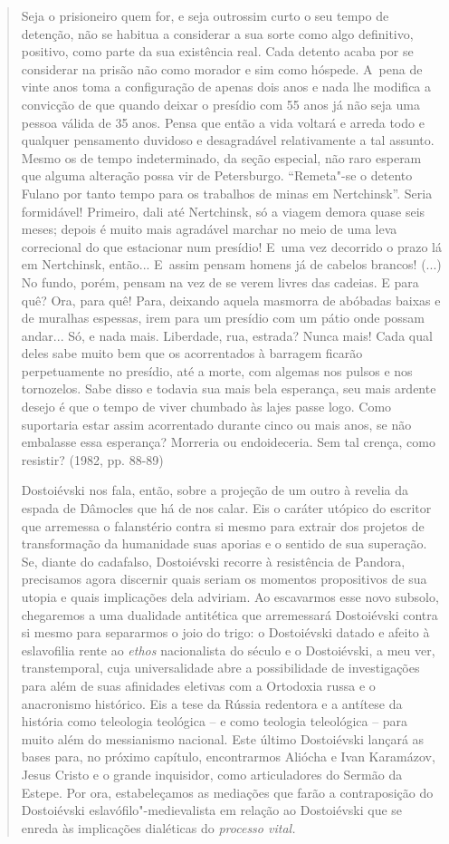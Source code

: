 {\begin{quote}
Seja o prisioneiro quem for, e seja outrossim curto o seu tempo de
detenção, não se habitua a considerar a sua sorte como algo definitivo,
positivo, como parte da sua existência real. Cada detento acaba por se
considerar na prisão não como morador e sim como hóspede. A~pena de
vinte anos toma a configuração de apenas dois anos e nada lhe modifica a
convicção de que quando deixar o presídio com 55 anos já não seja uma
pessoa válida de 35 anos. Pensa que então a vida voltará e arreda todo e
qualquer pensamento duvidoso e desagradável relativamente a tal assunto.
Mesmo os de tempo indeterminado, da seção especial, não raro esperam que
alguma alteração possa vir de Petersburgo. ``Remeta"-se o detento Fulano
por tanto tempo para os trabalhos de minas em Nertchinsk''. Seria
formidável! Primeiro, dali até Nertchinsk, só a viagem demora quase seis
meses; depois é muito mais agradável marchar no meio de uma leva
correcional do que estacionar num presídio! E~uma vez decorrido o prazo
lá em Nertchinsk, então... E~assim pensam homens já de cabelos brancos!
(...) No fundo, porém, pensam na vez de se verem livres das cadeias. E
para quê? Ora, para quê! Para, deixando aquela masmorra de abóbadas
baixas e de muralhas espessas, irem para um presídio com um pátio onde
possam andar... Só, e nada mais. Liberdade, rua, estrada? Nunca mais!
Cada qual deles sabe muito bem que os acorrentados à barragem ficarão
perpetuamente no presídio, até a morte, com algemas nos pulsos e nos
tornozelos. Sabe disso e todavia sua mais bela esperança, seu mais
ardente desejo é que o tempo de viver chumbado às lajes passe logo. Como
suportaria estar assim acorrentado durante cinco ou mais anos, se não
embalasse essa esperança? Morreria ou endoideceria. Sem tal crença, como
resistir? (1982, pp. 88-89)

Dostoiévski nos fala, então, sobre a projeção de um outro à revelia da
espada de Dâmocles que há de nos calar. Eis o caráter utópico do
escritor que arremessa o falanstério contra si mesmo para extrair dos
projetos de transformação da humanidade suas aporias e o sentido de sua
superação. Se, diante do cadafalso, Dostoiévski recorre à resistência de
Pandora, precisamos agora discernir quais seriam os momentos
propositivos de sua utopia e quais implicações dela adviriam. Ao
escavarmos esse novo subsolo, chegaremos a uma dualidade antitética que
arremessará Dostoiévski contra si mesmo para separarmos o joio do trigo:
o Dostoiévski datado e afeito à eslavofilia rente ao \emph{ethos}
nacionalista do século  e o Dostoiévski, a meu ver, transtemporal,
cuja universalidade abre a possibilidade de investigações para além de
suas afinidades eletivas com a Ortodoxia russa e o anacronismo
histórico. Eis a tese da Rússia redentora e a antítese da história como
teleologia teológica -- e como teologia teleológica -- para muito além
do messianismo nacional. Este último Dostoiévski lançará as bases para,
no próximo capítulo, encontrarmos Aliócha e Ivan Karamázov, Jesus Cristo
e o grande inquisidor, como articuladores do Sermão da Estepe. Por ora,
estabeleçamos as mediações que farão a contraposição do Dostoiévski
eslavófilo"-medievalista em relação ao Dostoiévski que se enreda às
implicações dialéticas do \emph{processo vital.}


\end{quote}}
